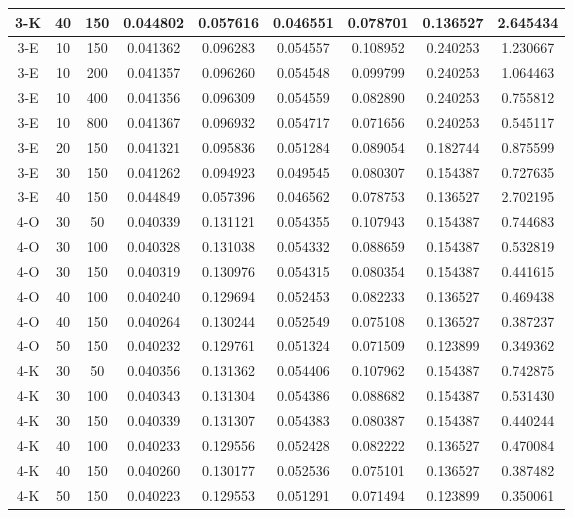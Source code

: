 \begin{center}
\begin{longtable}{|c|c|c|c|c|c|c|c|c|}
	\hline \rowcolor{bad} 3-K &	40 &	150	&	0.044802 &	0.057616 &	0.046551 &	0.078701 &	0.136527 &	2.645434 \\
	\hline 3-E &	10 &	150	&	0.041362 &	0.096283 &	0.054557 &	0.108952 &	0.240253 &	1.230667 \\
	\hline 3-E &	10 &	200	&	0.041357 &	0.096260 &	0.054548 &	0.099799 &	0.240253 &	1.064463 \\
	\hline 3-E &	10 &	400	&	0.041356 &	0.096309 &	0.054559 &	0.082890 &	0.240253 &	0.755812 \\
	\hline \rowcolor{bad} 3-E &	10 &	800	&	0.041367 &	0.096932 &	0.054717 &	0.071656 &	0.240253 &	0.545117 \\
	\hline 3-E &	20 &	150	&	0.041321 &	0.095836 &	0.051284 &	0.089054 &	0.182744 &	0.875599 \\
	\hline 3-E &	30 &	150	&	0.041262 &	0.094923 &	0.049545 &	0.080307 &	0.154387 &	0.727635 \\
	\hline \rowcolor{bad} 3-E &	40 &	150	&	0.044849 &	0.057396 &	0.046562 &	0.078753 &	0.136527 &	2.702195 \\
	\hline 4-O &	30 &	50	&	0.040339 &	0.131121 &	0.054355 &	0.107943 &	0.154387 &	0.744683 \\
	\hline 4-O &	30 &	100	&	0.040328 &	0.131038 &	0.054332 &	0.088659 &	0.154387 &	0.532819 \\
	\hline 4-O &	30 &	150	&	0.040319 &	0.130976 &	0.054315 &	0.080354 &	0.154387 &	0.441615 \\
	\hline 4-O &	40 &	100	&	0.040240 &	0.129694 &	0.052453 &	0.082233 &	0.136527 &	0.469438 \\
	\hline 4-O &	40 &	150	&	0.040264 &	0.130244 &	0.052549 &	0.075108 &	0.136527 &	0.387237 \\
	\hline \rowcolor{acceptable} 4-O &	50 &	150	&	0.040232 &	0.129761 &	0.051324 &	0.071509 &	0.123899 &	0.349362 \\
	\hline 4-K &	30 &	50	&	0.040356 &	0.131362 &	0.054406 &	0.107962 &	0.154387 &	0.742875 \\
	\hline 4-K &	30 &	100	&	0.040343 &	0.131304 &	0.054386 &	0.088682 &	0.154387 &	0.531430 \\
	\hline 4-K &	30 &	150	&	0.040339 &	0.131307 &	0.054383 &	0.080387 &	0.154387 &	0.440244 \\
	\hline 4-K &	40 &	100	&	0.040233 &	0.129556 &	0.052428 &	0.082222 &	0.136527 &	0.470084 \\
	\hline 4-K &	40 &	150	&	0.040260 &	0.130177 &	0.052536 &	0.075101 &	0.136527 &	0.387482 \\
	\hline \rowcolor{acceptable} 4-K &	50 &	150	&	0.040223 &	0.129553 &	0.051291 &	0.071494 &	0.123899 &	0.350061 \\

\end{longtable}
\end{center}
